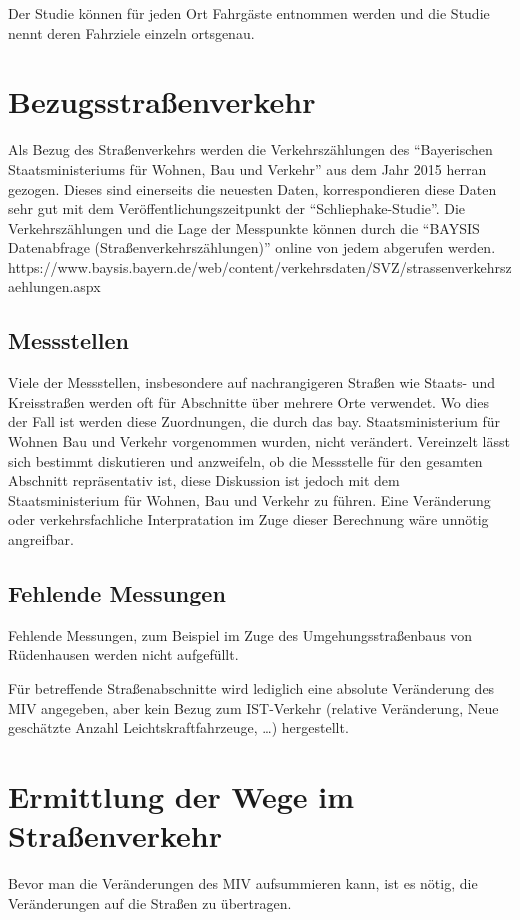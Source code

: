 \documentclass[fontsize=12pt,a4paper]{scrreprt}
\begin{document}
Der Studie können für jeden Ort Fahrgäste entnommen werden und die Studie nennt deren Fahrziele einzeln ortsgenau.

\section{Bezugsstraßenverkehr}
Als Bezug des Straßenverkehrs werden die Verkehrszählungen des \enquote{Bayerischen Staatsministeriums für Wohnen, Bau und Verkehr} aus dem Jahr 2015 herran gezogen. Dieses sind einerseits die neuesten Daten, korrespondieren diese Daten sehr gut mit dem Veröffentlichungszeitpunkt der \enquote{Schliephake-Studie}.
Die Verkehrszählungen und die Lage der Messpunkte können durch die \enquote{BAYSIS Datenabfrage (Straßenverkehrszählungen)} online von jedem abgerufen werden.
https://www.baysis.bayern.de/web/content/verkehrsdaten/SVZ/strassenverkehrszaehlungen.aspx

\subsection{Messstellen}
Viele der Messstellen, insbesondere auf nachrangigeren Straßen wie Staats- und Kreisstraßen werden oft für Abschnitte über mehrere Orte verwendet. Wo dies der Fall ist werden diese Zuordnungen, die durch das bay. Staatsministerium für Wohnen Bau und Verkehr vorgenommen wurden, nicht verändert. 
Vereinzelt lässt sich bestimmt diskutieren und anzweifeln, ob die Messstelle für den gesamten Abschnitt repräsentativ ist, diese Diskussion ist jedoch mit dem Staatsministerium für Wohnen, Bau und Verkehr zu führen. Eine Veränderung oder verkehrsfachliche Interpratation im Zuge dieser Berechnung wäre unnötig angreifbar.

\subsection{Fehlende Messungen}
Fehlende Messungen, zum Beispiel im Zuge des Umgehungsstraßenbaus von Rüdenhausen werden nicht aufgefüllt. 

Für betreffende Straßenabschnitte wird lediglich eine absolute Veränderung des MIV angegeben, aber kein Bezug zum IST-Verkehr (relative Veränderung, Neue geschätzte Anzahl Leichtskraftfahrzeuge, \ldots) hergestellt.
        \section{Ermittlung der Wege im Straßenverkehr}
Bevor man die Veränderungen des MIV aufsummieren kann, ist es nötig, die Veränderungen auf die Straßen zu übertragen.
\end{document}
